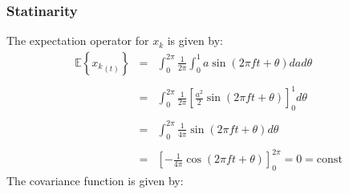 \documentclass[11pt, a4paper]{article}
\begin{document}
\subsubsection{Statinarity}
The expectation operator for $x_k$ is given by:
\begin{equation}
    \begin{array}{rcl}
        \displaystyle \mathbb{E}{\left\{{x_k}_{\left(t\right)}\right\}} & = & \displaystyle \int_{0}^{2\pi}{\frac{1}{2\pi}\int_{0}^{1}{a\sin{\left(2\pi ft+\theta\right)}da}d\theta} \\\\
        & = & \displaystyle \int_{0}^{2\pi}{\frac{1}{2\pi}\left[\frac{a^2}{2}\sin{\left(2\pi ft+\theta\right)}\right]_0^1d\theta} \\\\
        & = & \displaystyle \int_{0}^{2\pi}{\frac{1}{4\pi}\sin{\left(2\pi ft+\theta\right)}d\theta} \\\\
        & = & \displaystyle \left[-\frac{1}{4\pi}\cos{\left(2\pi ft+\theta\right)}\right]_0^{2\pi}=0=\text{const}
    \end{array}
\end{equation}
The covariance function is given by:
\end{document}
